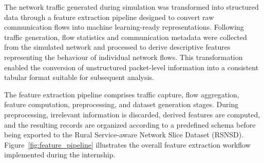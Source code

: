 \documentclass[12pt,a4paper]{report}
\begin{document}
	The network traffic generated during simulation was transformed into structured data through a feature extraction pipeline designed to convert raw communication flows into machine learning-ready representations. Following traffic generation, flow statistics and communication metadata were collected from the simulated network and processed to derive descriptive features representing the behaviour of individual network flows. This transformation enabled the conversion of unstructured packet-level information into a consistent tabular format suitable for subsequent analysis.
	
	The feature extraction pipeline comprises traffic capture, flow aggregation, feature computation, preprocessing, and dataset generation stages. During preprocessing, irrelevant information is discarded, derived features are computed, and the resulting records are organized according to a predefined schema before being exported to the Rural Service-aware Network Slice Dataset (RSNSD). Figure~\ref{fig:feature_pipeline} illustrates the overall feature extraction workflow implemented during the internship.
	
\end{document}
